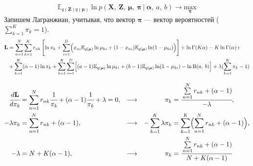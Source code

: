 \documentclass[twoside]{article}
\begin{document}
	\begin{align*}
	\mathbb{E}_{q(\textbf{Z})q(\boldsymbol{\mu})} \ln p(\textbf{X},\: \textbf{Z},\: \boldsymbol\mu,\: \boldsymbol{\pi}\: |\: \boldsymbol{\alpha},\: a,\: b) \rightarrow \underset{\boldsymbol{\pi}}{\mathrm{max}}
	\end{align*}
	Запишем Лагранжиан, учитывая, что вектор $\boldsymbol\pi$ --- вектор вероятностей ($\sum\limits_{k = 1}^K \pi_k = 1$).
	\begin{align*}
	\textbf{L} &=
	\sum_{n = 1}^N \sum_{k = 1}^K r_{nk} \left[\ln \pi_k +  \sum_{i = 1}^D \Bigl(x_{ni} \mathbb{E}_{q(\boldsymbol{\mu})} \ln\mu_{ki} + (1 - x_{ni}) \mathbb{E}_{q(\boldsymbol{\mu})} \ln(1 - \mu_{ki}) \Bigr)  \right] + 
	\ln \Gamma(K \alpha) - K \ln \Gamma(\alpha) +\\
	&+ \sum_{k = 1}^K (\alpha - 1)\ln \pi_k
	+ \sum_{k = 1}^K \sum_{i = 1}^D \Bigl[ (a - 1) \mathbb{E}_{q(\boldsymbol{\mu})}\ln \mu_{ki} + (b - 1) \mathbb{E}_{q(\boldsymbol{\mu})}\ln(1 - \mu_{ki}) - \ln \mathrm{B}(a, \:b) \Bigr]
	+ \lambda (\sum_{k = 1}^K \pi_k - 1)
	\end{align*}
	
	
	\begin{align*}
	\cfrac{d\textbf{L}}{d\pi_k} &= \sum_{n = 1}^N r_{nk}
	\cfrac{1}{\pi_k} + (\alpha - 1)\cfrac{1}{\pi_k} + \lambda = 0, &\longrightarrow & &
	\pi_k &= 
	\cfrac{\sum\limits_{n = 1}^N r_{nk} + (\alpha - 1)}{-\lambda},		\\
	-\lambda  \pi_k &= \sum\limits_{n = 1}^N r_{nk} + (\alpha - 1), &\longrightarrow &&
	-\sum_{k=1}^K\lambda \pi_k &= \sum_{k=1}^K \Bigl(\sum\limits_{n = 1}^N r_{nk} + (\alpha - 1)\Bigr),			\\
	-\lambda &= N + K(\alpha - 1), &\longrightarrow  &&
	\pi_k &= 
	\cfrac{\sum\limits_{n = 1}^N r_{nk} + (\alpha - 1)}{ N + K(\alpha - 1)}		\\
	\end{align*}
	
\end{document}

